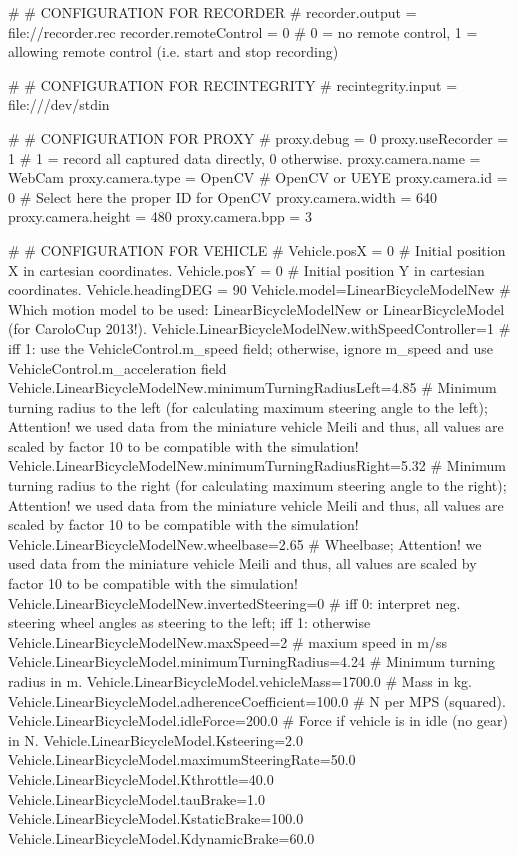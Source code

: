 #
# CONFIGURATION FOR RECORDER
#
recorder.output = file://recorder.rec
recorder.remoteControl = 0 # 0 = no remote control, 1 = allowing remote control (i.e. start and stop recording)


#
# CONFIGURATION FOR RECINTEGRITY
#
recintegrity.input = file:///dev/stdin


#
# CONFIGURATION FOR PROXY
#
proxy.debug = 0
proxy.useRecorder = 1 # 1 = record all captured data directly, 0 otherwise. 
proxy.camera.name = WebCam
proxy.camera.type = OpenCV # OpenCV or UEYE
proxy.camera.id = 0 # Select here the proper ID for OpenCV
proxy.camera.width = 640
proxy.camera.height = 480
proxy.camera.bpp = 3



#
# CONFIGURATION FOR VEHICLE
#
Vehicle.posX = 0                     # Initial position X in cartesian coordinates.
Vehicle.posY = 0                     # Initial position Y in cartesian coordinates.
Vehicle.headingDEG = 90
Vehicle.model=LinearBicycleModelNew  # Which motion model to be used: LinearBicycleModelNew or LinearBicycleModel (for CaroloCup 2013!).
Vehicle.LinearBicycleModelNew.withSpeedController=1          # iff 1: use the VehicleControl.m_speed field; otherwise, ignore m_speed and use VehicleControl.m_acceleration field
Vehicle.LinearBicycleModelNew.minimumTurningRadiusLeft=4.85  # Minimum turning radius to the left (for calculating maximum steering angle to the left); Attention! we used data from the miniature vehicle Meili and thus, all values are scaled by factor 10 to be compatible with the simulation!
Vehicle.LinearBicycleModelNew.minimumTurningRadiusRight=5.32 # Minimum turning radius to the right (for calculating maximum steering angle to the right); Attention! we used data from the miniature vehicle Meili and thus, all values are scaled by factor 10 to be compatible with the simulation!
Vehicle.LinearBicycleModelNew.wheelbase=2.65                 # Wheelbase; Attention! we used data from the miniature vehicle Meili and thus, all values are scaled by factor 10 to be compatible with the simulation!
Vehicle.LinearBicycleModelNew.invertedSteering=0             # iff 0: interpret neg. steering wheel angles as steering to the left; iff 1: otherwise
Vehicle.LinearBicycleModelNew.maxSpeed=2                # maxium speed in m/ss
Vehicle.LinearBicycleModel.minimumTurningRadius=4.24    # Minimum turning radius in m.
Vehicle.LinearBicycleModel.vehicleMass=1700.0           # Mass in kg.
Vehicle.LinearBicycleModel.adherenceCoefficient=100.0   # N per MPS (squared).
Vehicle.LinearBicycleModel.idleForce=200.0              # Force if vehicle is in idle (no gear) in N.
Vehicle.LinearBicycleModel.Ksteering=2.0
Vehicle.LinearBicycleModel.maximumSteeringRate=50.0
Vehicle.LinearBicycleModel.Kthrottle=40.0
Vehicle.LinearBicycleModel.tauBrake=1.0
Vehicle.LinearBicycleModel.KstaticBrake=100.0
Vehicle.LinearBicycleModel.KdynamicBrake=60.0

